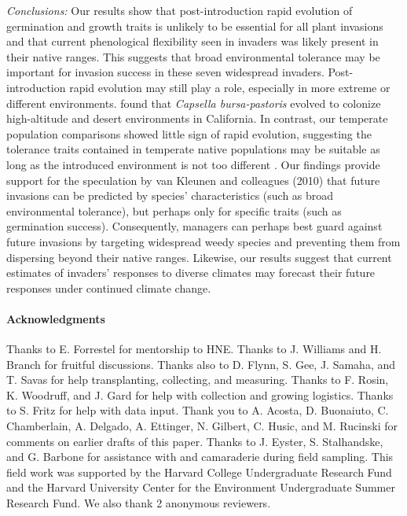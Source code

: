 \documentclass[11pt]{article}\usepackage[]{graphicx}\usepackage[]{color}
\begin{document}
\emph{Conclusions:} 
	Our results show that post-introduction rapid evolution of germination and growth traits is unlikely to be essential for all plant invasions and that current phenological flexibility seen in invaders was likely present in their native ranges. This suggests that broad environmental tolerance may be important for invasion success in these seven widespread invaders. Post-introduction rapid evolution may still play a role, especially in more extreme or different environments.  \textcite{Linde2001} found that \textit{Capsella bursa-pastoris} evolved to colonize high-altitude and desert environments in California. In contrast, our temperate population comparisons showed little sign of rapid evolution, suggesting the tolerance traits contained in temperate native populations may be suitable as long as the introduced environment is not too different \parencite{Baker1965}. Our findings provide support for  the speculation by van Kleunen and colleagues (2010) that future invasions can be predicted by species' characteristics (such as broad environmental tolerance), but perhaps only for specific traits (such as germination success). Consequently, managers can perhaps best guard against future invasions by targeting widespread weedy species and preventing them from dispersing beyond their native ranges. Likewise, our results suggest that current estimates of invaders' responses to diverse climates may forecast their future responses under continued climate change. 
	
\paragraph{Acknowledgments}
Thanks to E. Forrestel for mentorship to HNE. Thanks to J. Williams and H. Branch for fruitful discussions. Thanks also to D. Flynn, S. Gee, J. Samaha, and T. Savas for help transplanting, collecting, and measuring. Thanks to F. Rosin, K. Woodruff, and J. Gard for help with collection and growing logistics. Thanks to S. Fritz for help with data input. Thank you to A. Acosta, D. Buonaiuto, C. Chamberlain, A. Delgado, A. Ettinger, N. Gilbert, C. Husic, and M. Rucinski for comments on earlier drafts of this paper. Thanks to J. Eyster, S. Stalhandske, and G. Barbone for assistance with and camaraderie during field sampling. This field work was supported by the Harvard College Undergraduate Research Fund and the Harvard University Center for the Environment Undergraduate Summer Research Fund.  We also thank 2 anonymous reviewers. %
\end{document}
